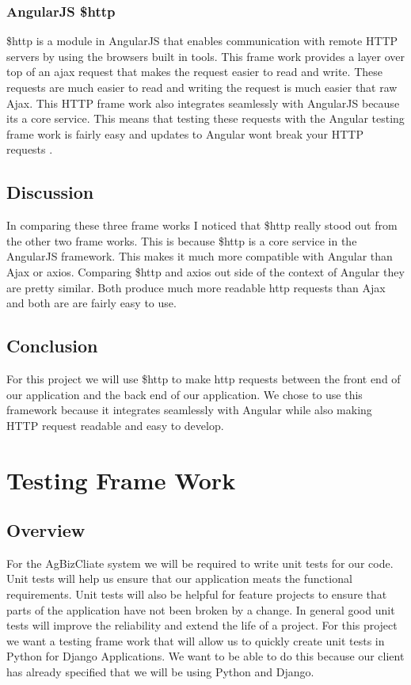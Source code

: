 \documentclass[onecolumn, draftclsnofoot,10pt, compsoc]{article}
\begin{document}
		\subsubsection{AngularJS \$http}
		\$http is a module in AngularJS that enables communication with remote HTTP servers by using the browsers built in tools. This frame work provides a layer over top of an ajax request that makes the request easier to read and write. These requests are much easier to read and writing the request is much easier that raw Ajax. This HTTP frame work also integrates seamlessly with AngularJS because its a core service. This means that testing these requests with the Angular testing frame work is fairly easy and updates to Angular wont break your HTTP requests \cite{IEEEexample:axios}\cite{IEEEexample:AngularJS}.
	\subsection{Discussion}
		In comparing these three frame works I noticed that \$http really stood out from the other two frame works. This is because \$http is a core service in the AngularJS framework. This makes it much more compatible with Angular than Ajax or axios. Comparing \$http and axios out side of the context of Angular they are pretty similar. Both produce much more readable http requests than Ajax and both are are fairly easy to use.
	\subsection{Conclusion}
	For this project we will use \$http to make http requests between the front end of our application and the back end of our application. We chose to use this framework because it integrates seamlessly with Angular while also making HTTP request readable and easy to develop.
	
\section{Testing Frame Work}
	\subsection{Overview}
						For the AgBizCliate system we will be required to write unit tests for our code. Unit tests will help us ensure that our application meats the functional requirements. Unit tests will also be helpful for feature projects to ensure that parts of the application have not been broken by a change. In general good unit tests will improve the reliability and extend the life of a project. For this project we want a testing frame work that will allow us to quickly create unit tests in Python for Django Applications. We want to be able to do this because our client has already specified that we will be using Python and Django.\\
\end{document}
